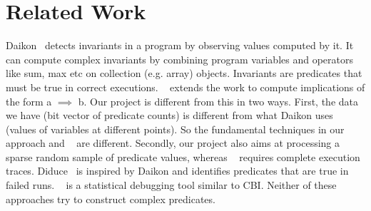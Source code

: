 \section{Related Work}
\label{sec-rw}
Daikon~\cite{ErnstPGMPTX2006} detects invariants in a program by observing values computed by it.  It can compute complex invariants by combining program variables and operators like sum, max etc on collection (e.g. array) objects.  Invariants are predicates that must be true in correct executions.  ~\cite{ErnstDRAFT} extends the work to compute implications of the form a $\implies$ b.  Our project is different from this in two ways.  First, the data we have (bit vector of predicate counts) is different from what Daikon uses (values of variables at different points).  So the fundamental techniques in our approach and ~\cite{ErnstDRAFT} are different.  Secondly, our project also aims at processing a sparse random sample of predicate values, whereas ~\cite{ErnstPGMPTX2006} requires complete execution traces.  Diduce~\cite{581377} is inspired by Daikon and identifies predicates that are true in failed runs.  ~\cite{1081753} is a statistical debugging tool similar to CBI.  Neither of these approaches try to construct complex predicates.
